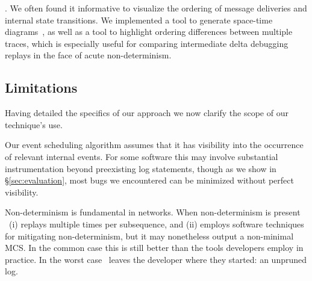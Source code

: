 . We often found it informative to visualize
the ordering of message deliveries and internal
state transitions. We implemented
a tool to generate space-time diagrams~\cite{Lamport:1978:TCO:359545.359563},
as well as a tool to highlight ordering differences
between multiple traces, which is especially useful for comparing
intermediate delta debugging replays in the face of acute non-determinism.


\subsection{Limitations}
\label{subsec:non_goals}

Having detailed the specifics of our approach we now
clarify the scope of our technique's use.

 Our event scheduling algorithm assumes that
it has visibility into the occurrence of relevant internal events. For
some software this may involve substantial instrumentation beyond
preexisting log statements, though as we show in \S\ref{sec:evaluation}, most bugs
we encountered can be minimized without perfect visibility.

 Non-determinism
is fundamental in networks. When non-determinism is present
\projectname~(i) replays multiple times per subsequence, and (ii) employs
software techniques for mitigating non-determinism, but it may nonetheless
output a non-minimal MCS. In the common case this is still
better than the tools developers employ in practice.
In the worst case \projectname~leaves the
developer where they started: an unpruned log.


